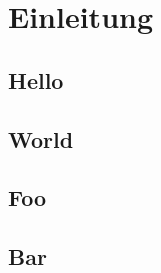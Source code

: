 \chapter{Einleitung}

    \section{Hello}
        \lipsum[20]
        
    \section{World}
        \lipsum[21]
        
    \section{Foo}
        

        
        
        \lipsum[21]
        
    \section{Bar}
        \lipsum[45]
        